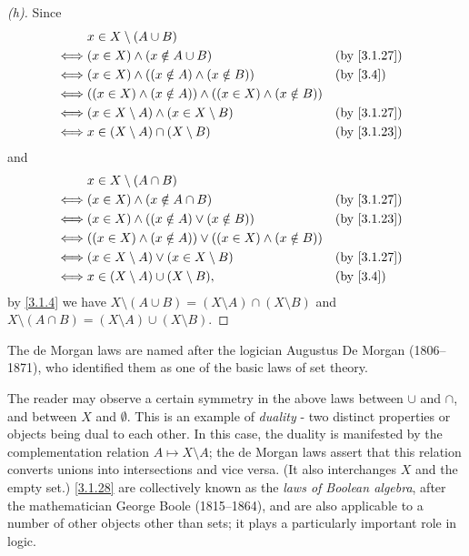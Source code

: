 \begin{proof}[(h)]
  Since
  \begin{align*}
         & x \in X \setminus (A \cup B)                                                         \\
    \iff & (x \in X) \land (x \notin A \cup B)                                 &  & \by{3.1.27} \\
    \iff & (x \in X) \land ((x \notin A) \land (x \notin B))                   &  & \by{3.4}    \\
    \iff & ((x \in X) \land (x \notin A)) \land ((x \in X) \land (x \notin B))                  \\
    \iff & (x \in X \setminus A) \land (x \in X \setminus B)                   &  & \by{3.1.27} \\
    \iff & x \in (X \setminus A) \cap (X \setminus B)                          &  & \by{3.1.23}
  \end{align*}
  and
  \begin{align*}
         & x \in X \setminus (A \cap B)                                                        \\
    \iff & (x \in X) \land (x \notin A \cap B)                                &  & \by{3.1.27} \\
    \iff & (x \in X) \land ((x \notin A) \lor (x \notin B))                   &  & \by{3.1.23} \\
    \iff & ((x \in X) \land (x \notin A)) \lor ((x \in X) \land (x \notin B))                  \\
    \iff & (x \in X \setminus A) \lor (x \in X \setminus B)                   &  & \by{3.1.27} \\
    \iff & x \in (X \setminus A) \cup (X \setminus B),                        &  & \by{3.4}
  \end{align*}
  by \cref{3.1.4} we have \(X \setminus (A \cup B) = (X \setminus A) \cap (X \setminus B)\) and \(X \setminus (A \cap B) = (X \setminus A) \cup (X \setminus B)\).
\end{proof}

\begin{rmk}\label{3.1.29}
  The de Morgan laws are named after the logician Augustus De Morgan (1806--1871), who identified them as one of the basic laws of set theory.
\end{rmk}

\begin{rmk}\label{3.1.30}
  The reader may observe a certain symmetry in the above laws between \(\cup\) and \(\cap\), and between \(X\) and \(\emptyset\).
  This is an example of \emph{duality} - two distinct properties or objects being dual to each other.
  In this case, the duality is manifested by the complementation relation \(A \mapsto X \setminus A\);
  the de Morgan laws assert that this relation converts unions into intersections and vice versa.
  (It also interchanges \(X\) and the empty set.)
  \cref{3.1.28} are collectively known as the \emph{laws of Boolean algebra}, after the mathematician George Boole (1815--1864), and are also applicable to a number of other objects other than sets;
  it plays a particularly important role in logic.
\end{rmk}

